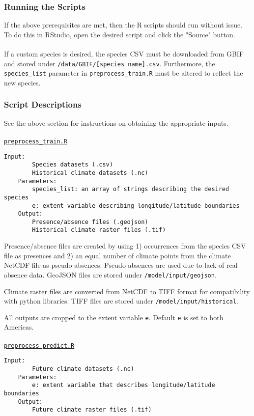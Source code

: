 \documentclass{article}
\begin{document}
\subsubsection*{Running the Scripts}

If the above prerequisites are met, then the R scripts should run without issue. To do this in RStudio, open the desired script and click the "Source" button.
\\\\
If a custom species is desired, the species CSV must be downloaded from GBIF and stored under \texttt{/data/GBIF/[species name].csv}. Furthermore, the \texttt{species\_list} parameter in \texttt{preprocess\_train.R} must be altered to reflect the new species. 

\subsubsection*{Script Descriptions}
See the above section for instructions on obtaining the appropriate inputs.
\\\\
\texttt{\underline{{preprocess\_train.R}}}
\begin{Verbatim}[tabsize=4]
	Input:	
		Species datasets (.csv)
		Historical climate datasets (.nc)
	Parameters:
		species_list: an array of strings describing the desired species 
		e: extent variable describing longitude/latitude boundaries 
	Output:
		Presence/absence files (.geojson)
		Historical climate raster files (.tif)
\end{Verbatim}

\noindent Presence/absence files are created by using 1) occurrences from the species CSV file as presences and 2) an equal number of climate points from the climate NetCDF file as pseudo-absences. Pseudo-absences are used due to lack of real absence data. GeoJSON files are stored under \texttt{/model/input/geojson}.

Climate raster files are converted from NetCDF to TIFF format for compatibility with python libraries. TIFF files are stored under \texttt{/model/input/historical}.

All outputs are cropped to the extent variable \texttt{e}. Default \texttt{e} is set to both Americas.
\\\\
\texttt{\underline{preprocess\_predict.R}}
\begin{Verbatim}[tabsize=4]
	Input:	
		Future climate datasets (.nc)
	Parameters:
		e: extent variable that describes longitude/latitude boundaries 
	Output:
		Future climate raster files (.tif)
\end{Verbatim}
\end{document}
